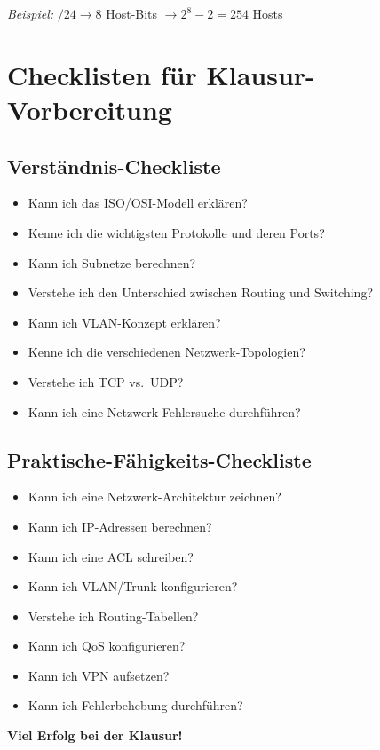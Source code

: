 \documentclass[12pt,a4paper,german]{report}
\begin{document}
\textit{Beispiel:} $/24 \rightarrow 8$ Host-Bits $\rightarrow 2^8 - 2 = 254$ Hosts

\part{Checklisten für Klausur-Vorbereitung}

\chapter{Verständnis-Checkliste}

\begin{itemize}
    \item[$\checkmark$] Kann ich das ISO/OSI-Modell erklären?
    \item[$\checkmark$] Kenne ich die wichtigsten Protokolle und deren Ports?
    \item[$\checkmark$] Kann ich Subnetze berechnen?
    \item[$\checkmark$] Verstehe ich den Unterschied zwischen Routing und Switching?
    \item[$\checkmark$] Kann ich VLAN-Konzept erklären?
    \item[$\checkmark$] Kenne ich die verschiedenen Netzwerk-Topologien?
    \item[$\checkmark$] Verstehe ich TCP vs.\ UDP?
    \item[$\checkmark$] Kann ich eine Netzwerk-Fehlersuche durchführen?
\end{itemize}

\chapter{Praktische-Fähigkeits-Checkliste}

\begin{itemize}
    \item[$\checkmark$] Kann ich eine Netzwerk-Architektur zeichnen?
    \item[$\checkmark$] Kann ich IP-Adressen berechnen?
    \item[$\checkmark$] Kann ich eine ACL schreiben?
    \item[$\checkmark$] Kann ich VLAN/Trunk konfigurieren?
    \item[$\checkmark$] Verstehe ich Routing-Tabellen?
    \item[$\checkmark$] Kann ich QoS konfigurieren?
    \item[$\checkmark$] Kann ich VPN aufsetzen?
    \item[$\checkmark$] Kann ich Fehlerbehebung durchführen?
\end{itemize}

\vfill
\begin{center}
\textbf{\Large Viel Erfolg bei der Klausur!}
\end{center}
\end{document}

